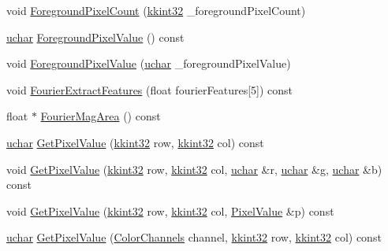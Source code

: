 \begin{DoxyCompactItemize}
void \hyperlink{class_k_k_b_1_1_raster_aec13e4947e66742d2cc3dd71cd4f713c}{Foreground\+Pixel\+Count} (\hyperlink{namespace_k_k_b_a8fa4952cc84fda1de4bec1fbdd8d5b1b}{kkint32} \+\_\+foreground\+Pixel\+Count)
\item 
\hyperlink{namespace_k_k_b_ace9969169bf514f9ee6185186949cdf7}{uchar} \hyperlink{class_k_k_b_1_1_raster_a11b142b955f79a1482606a32ce209373}{Foreground\+Pixel\+Value} () const 
\item 
void \hyperlink{class_k_k_b_1_1_raster_a1ea84f51a0a064df90791ad229c5dab6}{Foreground\+Pixel\+Value} (\hyperlink{namespace_k_k_b_ace9969169bf514f9ee6185186949cdf7}{uchar} \+\_\+foreground\+Pixel\+Value)
\item 
void \hyperlink{class_k_k_b_1_1_raster_aab93f287971129b24f374d94ca38a5d9}{Fourier\+Extract\+Features} (float fourier\+Features\mbox{[}5\mbox{]}) const 
\item 
float $\ast$ \hyperlink{class_k_k_b_1_1_raster_ac94aed2b3906aab15df37838d286b0d9}{Fourier\+Mag\+Area} () const 
\item 
\hyperlink{namespace_k_k_b_ace9969169bf514f9ee6185186949cdf7}{uchar} \hyperlink{class_k_k_b_1_1_raster_aa472a98997466422f24cb5b534cff974}{Get\+Pixel\+Value} (\hyperlink{namespace_k_k_b_a8fa4952cc84fda1de4bec1fbdd8d5b1b}{kkint32} row, \hyperlink{namespace_k_k_b_a8fa4952cc84fda1de4bec1fbdd8d5b1b}{kkint32} col) const 
\item 
void \hyperlink{class_k_k_b_1_1_raster_a52256bcca71985aff40bc96101e8a14d}{Get\+Pixel\+Value} (\hyperlink{namespace_k_k_b_a8fa4952cc84fda1de4bec1fbdd8d5b1b}{kkint32} row, \hyperlink{namespace_k_k_b_a8fa4952cc84fda1de4bec1fbdd8d5b1b}{kkint32} col, \hyperlink{namespace_k_k_b_ace9969169bf514f9ee6185186949cdf7}{uchar} \&r, \hyperlink{namespace_k_k_b_ace9969169bf514f9ee6185186949cdf7}{uchar} \&g, \hyperlink{namespace_k_k_b_ace9969169bf514f9ee6185186949cdf7}{uchar} \&b) const 
\item 
void \hyperlink{class_k_k_b_1_1_raster_ac8f891c48cad1ccfbde5eb70bdba3915}{Get\+Pixel\+Value} (\hyperlink{namespace_k_k_b_a8fa4952cc84fda1de4bec1fbdd8d5b1b}{kkint32} row, \hyperlink{namespace_k_k_b_a8fa4952cc84fda1de4bec1fbdd8d5b1b}{kkint32} col, \hyperlink{class_k_k_b_1_1_pixel_value}{Pixel\+Value} \&p) const 
\item 
\hyperlink{namespace_k_k_b_ace9969169bf514f9ee6185186949cdf7}{uchar} \hyperlink{class_k_k_b_1_1_raster_a42e210e47eaa87454e2f230bc658a94f}{Get\+Pixel\+Value} (\hyperlink{namespace_k_k_b_a91743d17eafa05c7ff4e08017ac2b718}{Color\+Channels} channel, \hyperlink{namespace_k_k_b_a8fa4952cc84fda1de4bec1fbdd8d5b1b}{kkint32} row, \hyperlink{namespace_k_k_b_a8fa4952cc84fda1de4bec1fbdd8d5b1b}{kkint32} col) const 

\end{DoxyCompactItemize}
